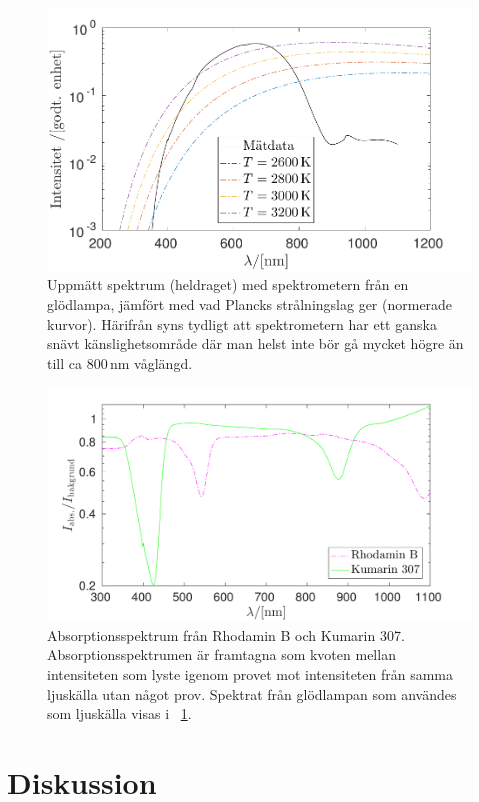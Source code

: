 \documentclass[11pt,a4paper]{article}
\newcommand{\figref}{\figurename~\ref}
\begin{document}
\begin{figure}\centering
\centerline{ %
\includegraphics[width=.9\textwidth]{svartkropp.pdf}
}
\caption{Uppmätt spektrum (heldraget) med spektrometern från en
  glödlampa, jämfört med vad Plancks strålningslag ger (normerade
  kurvor). Härifrån syns tydligt att spektrometern har ett ganska
  snävt känslighetsområde där man helst inte bör gå mycket högre än
  till ca 800\,nm våglängd.}
\label{fig:svartkropp}
\end{figure}

\begin{figure}\centering
\centerline{ %
\includegraphics[width=1\textwidth]{absorption.pdf}
}
\caption{Absorptionsspektrum från Rhodamin B och Kumarin
  307. Absorptionsspektrumen är framtagna som kvoten mellan
  intensiteten som lyste igenom provet mot intensiteten från samma
  ljuskälla utan något prov. Spektrat från glödlampan som användes som
  ljuskälla visas i \figref{fig:svartkropp}. 
}
\label{fig:absorption} 
\end{figure}

 \section{Diskussion}
\end{document}
